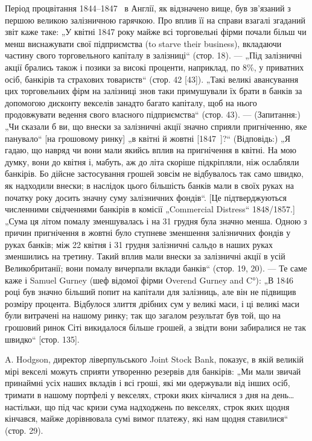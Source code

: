 Період процвітання 1844--1847~ в Англії, як відзначено вище, був зв’язаний
з першою великою залізничною гарячкою. Про вплив її на справи взагалі згаданий звіт каже таке: „У
квітні 1847 року майже всі торговельні фірми почали
більш чи менш виснажувати свої підприємства (to starve their business), вкладаючи частину свого
торговельного капіталу в залізниці“ (стор. 18). — „Під залізничні акції брались також і позики за
високі проценти, наприклад, по 8\%,
у приватних осіб, банкірів та страхових товариств“ (стор. 42 [43]). „Такі великі
авансування цих торговельних фірм на залізниці знов таки примушували їх брати
в банків за допомогою дисконту векселів занадто багато капіталу, щоб на нього
продовжувати ведення свого власного підприємства“ (стор. 43). — (Запитання:) „Чи
сказали б ви, що внески за залізничні акції значно сприяли пригніченню, яке
панувало“ [на грошовому ринку] „в квітні й жовтні [1847~]?“ (Відповідь:) „Я гадаю, що навряд чи
вони мали якийсь вплив на пригнічення в квітні. На мою думку,
вони до квітня і, мабуть, аж до літа скоріше підкріпляли, ніж ослабляли банкірів.
Бо дійсне застосування грошей зовсім не відбувалось так само швидко, як надходили внески; в наслідок
цього більшість банків мали в своїх руках на початку
року досить значну суму залізничних фондів“. [Це підтверджуються численними
свідченнями банкірів в комісії „Commercial Distress“ 1848/1857.] „Сума ця літом
помалу зменшувалась і на 31 грудня була значно менша. Одною з причин
пригнічення в жовтні було ступневе зменшення залізничних фондів у руках
банків; між 22 квітня і 31 грудня залізничні сальдо в наших руках зменшились
на третину. Такий вплив мали внески за залізничні акції в усій Великобританії;
вони помалу вичерпали вклади банків“ (стор. 19, 20). — Те саме каже і Samuel
Gurney (шеф відомої фірми Overend Gurney and C°): „В 1846 році був значно
більший попит на капітали для залізниць, але він не підвищив розміру процента. Відбулося злиття
дрібних сум у великі маси, і ці великі маси були витрачені на нашому ринку; так що загалом результат
був той, що на грошовий
ринок Сіті викидалося більше грошей, а звідти вони забиралися не так
швидко“ [стор. 135].

A. Hodgson, директор ліверпульського Joint Stock Bank, показує, в якій великій мірі векселі можуть
сприяти утворенню резервів для банкірів: „Ми мали
звичай принаймні  усіх наших вкладів і всі гроші, які ми одержували від
інших осіб, тримати в нашому портфелі у векселях, строки яких кінчалися
з дня на день\dots{} настільки, що під час кризи сума надходжень по векселях,
строк яких щодня кінчався, майже дорівнювала сумі вимог платежу, які нам
щодня ставилися“ (стор. 29).

